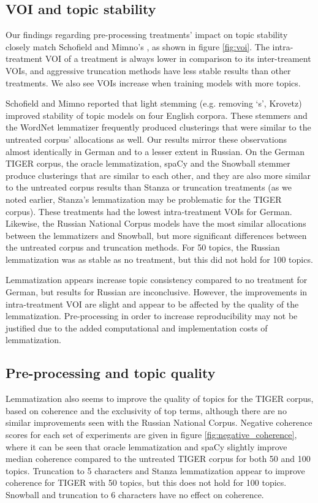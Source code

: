 \documentclass[11pt,a4paper]{article}
\begin{document}

\subsection{VOI and topic stability}
Our findings regarding pre-processing treatments' impact on topic stability closely match Schofield and Mimno's \cite{schofield-mimno-2016-comparing}, as shown in figure \ref{fig:voi}. The intra-treatment VOI of a treatment is always lower in comparison to its inter-treament VOIs, and aggressive truncation methods have less stable results than other treatments. We also see VOIs increase when training models with more topics.

Schofield and Mimno reported that light stemming (e.g. removing `s', Krovetz) improved stability of topic models on four English corpora. These stemmers and the WordNet lemmatizer frequently produced clusterings that were similar to the untreated corpus' allocations as well. Our results mirror these observations almost identically in German and to a lesser extent in Russian. On the German TIGER corpus, the oracle lemmatization, spaCy and the Snowball stemmer produce clusterings that are similar to each other, and they are also more similar to the untreated corpus results than Stanza or truncation treatments (as we noted earlier, Stanza's lemmatization may be problematic for the TIGER corpus). These treatments had the lowest intra-treatment VOIs for German. Likewise, the Russian National Corpus models have the most similar allocations between the lemmatizers and Snowball, but more significant differences between the untreated corpus and truncation methods. For 50 topics, the Russian lemmatization was as stable as no treatment, but this did not hold for 100 topics.

Lemmatization appears increase topic consistency compared to no treatment for German, but results for Russian are inconclusive. However, the improvements in intra-treatment VOI are slight and appear to be affected by the quality of the lemmatization. Pre-processing in order to increase reproducibility may not be justified due to the added computational and implementation costs of lemmatization.

\subsection{Pre-processing and topic quality}
Lemmatization also seems to improve the quality of topics for the TIGER corpus, based on coherence and the exclusivity of top terms, although there are no similar improvements seen with the Russian National Corpus.
Negative coherence scores for each set of experiments are given in figure \ref{fig:negative_coherence}, where it can be seen that oracle lemmatization and spaCy slightly improve median coherence compared to the untreated TIGER corpus for both 50 and 100 topics. Truncation to 5 characters and Stanza lemmatization appear to improve coherence for TIGER with 50 topics, but this does not hold for 100 topics. Snowball and truncation to 6 characters have no effect on coherence.
\end{document}
